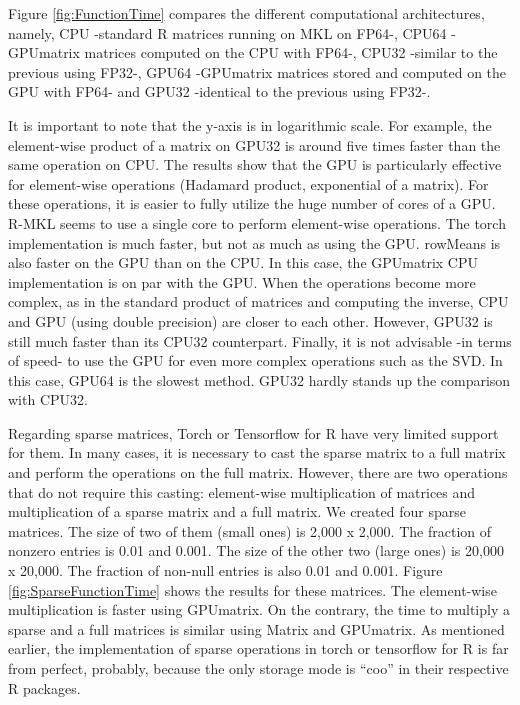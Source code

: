 Figure \ref{fig:FunctionTime} compares the different computational architectures, namely, CPU -standard R matrices running on MKL on FP64-, CPU64 -GPUmatrix matrices computed on the CPU with FP64-, CPU32 -similar to the previous using FP32-, GPU64 -GPUmatrix matrices stored and computed on the GPU with FP64- and GPU32 -identical to the previous using FP32-.

It is important to note that the y-axis is in logarithmic scale. For example, the element-wise product of a matrix on GPU32 is around five times faster than the same operation on CPU. The results show that the GPU is particularly effective for element-wise operations (Hadamard product, exponential of a matrix). For these operations, it is easier to fully utilize the huge number of cores of a GPU. R-MKL seems to use a single core to perform element-wise operations. The torch implementation is much faster, but not as much as using the GPU. rowMeans is also faster on the GPU than on the CPU. In this case, the GPUmatrix CPU implementation is on par with the GPU. When the operations become more complex, as in the standard product of matrices and computing the inverse, CPU and GPU (using double precision) are closer to each other. However, GPU32 is still much faster than its CPU32 counterpart. Finally, it is not advisable -in terms of speed- to use the GPU for even more complex operations such as the SVD. In this case, GPU64 is the slowest method. GPU32 hardly stands up the comparison with CPU32.

Regarding sparse matrices, Torch or Tensorflow for R have very limited support for them. In many cases, it is necessary to cast the sparse matrix to a full matrix and perform the operations on the full matrix. However, there are two operations that do not require this casting: element-wise multiplication of matrices and multiplication of a sparse matrix and a full matrix. We created four sparse matrices. The size of two of them (small ones) is 2,000 x 2,000. The fraction of nonzero entries is 0.01 and 0.001. The size of the other two (large ones) is 20,000 x 20,000. The fraction of non-null entries is also 0.01 and 0.001. Figure \ref{fig:SparseFunctionTime} shows the results for these matrices. The element-wise multiplication is faster using GPUmatrix. On the contrary, the time to multiply a sparse and a full matrices is similar using Matrix and GPUmatrix. As mentioned earlier, the implementation of sparse operations in torch or tensorflow for R is far from perfect, probably, because the only storage mode is ``coo'' in their respective R packages.

